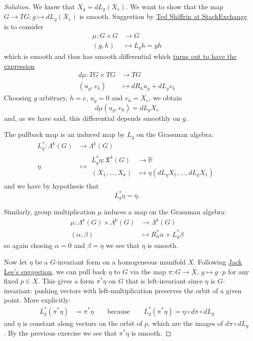 \begin{proof}[Solution]\leavevmode
	We know that $X_g=dL_g(X_e)$. We want to show that the map $G \to TG:g\mapsto dL_g(X_e)$ is smooth. Suggestion by \href{https://math.stackexchange.com/questions/1126553/left-invariant-vector-fields-smoothness}{Ted Shiffrin at StackExchange} is to consider 
	\begin{align*}
		\mu: G\times G &\longrightarrow G \\
		(g,h) &\longmapsto L_gh=gh
	\end{align*}
	which is smooth and thus has smooth differential which \href{https://math.stackexchange.com/questions/1740179/differential-of-the-multiplication-and-inverse-maps-on-a-lie-group}{turns out to have the expression}
	\begin{align*}
		d\mu: TG\times TG &\longrightarrow TG \\
		(u_g,v_h) &\longmapsto dR_hu_g+dL_g v_h
	\end{align*}
	Choosing $g$ arbitrary, $h=e$, $u_g=0$ and $v_h=X_e$, we obtain
	\[d\mu(u_g,v_h)=dL_gX_e\]
	and, as we have said, this differential depends smoothly on $g$.

	The pullback map is an induced map by $L_g$ on the Grassman algebra:
	\begin{align*}
		L_g^*: \Lambda^{k}(G) &\longrightarrow \Lambda^{k}(G) \\
		\eta &\longmapsto \begin{aligned}
			L_g^*\eta: \mathfrak{X}^k(G) &\longrightarrow \mathbb{R} \\
			(X_1,\ldots,X_k) &\longmapsto \eta(dL_gX_1,\ldots,dL_gX_1)
		\end{aligned}
	\end{align*}
and we have by hypothesis that 
\[L_g^*\eta=\eta.\]

Similarly, group multiplication $\mu$ induces a map on the Grassman algebra:
\begin{align*}
	\mu: \Lambda^{k}(G) \times \Lambda^{k}(G)&\longrightarrow \Lambda^{k}(G) \\
	(\alpha,\beta) &\longmapsto R_h^*\alpha+L_g^*\beta
\end{align*}
so again chosing $\alpha=0$ and $\beta=\eta$ we see that $\eta$ is smooth.

Now let $\eta$ be a $G$-invariant form on a homogeneous manifold $X$. Following \href{https://math.stackexchange.com/questions/4298636/smoothness-of-a-g-invariant-k-form}{Jack Lee's suggestion}, we can pull back $\eta$ to $G$ via the map $\pi:G\to X$, $g\mapsto g\cdot p$ for any fixed $p \in X$. This gives a form $\pi^*\eta$ on $G$ that is left-invariant since  $\eta$ is $G$-invariant: pushing vectors with left-multiplication preserves the orbit of a given point. More explicitly:
\begin{align*}
	L^*_g(\pi^*\eta)&=\pi^*\eta\qquad \text{because}\qquad 
	L^*_g(\pi^*\eta)=\eta\circ d\pi\circ dL_g
\end{align*}
and $\eta$ is constant along vectors on the orbit of $p$, which are the images of $d\pi\circ dL_g$. By the previous exercise we see that $\pi^*\eta$ is smooth.


\end{proof}
